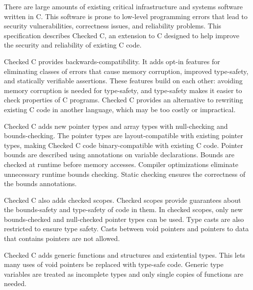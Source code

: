 
\parbox{6.0in}{
There are large amounts of existing critical infrastructure and
systems software written in C. This software is prone to
low-level programming errors that lead to security vulnerabilities,
correctness issues, and reliability problems.  This specification describes
Checked C, an extension to C designed to help improve the security and 
reliability of existing C code.
}

\vspace{11pt}

\parbox{6.0in}{Checked C provides backwards-compatibility.
It adds opt-in features for eliminating classes of errors that
cause memory corruption, improved type-safety, and  statically verifiable
assertions.
These features build on each other: avoiding memory corruption
is needed for type-safety, and type-safety makes it easier
to check properties of C programs.
Checked C provides an alternative to rewriting existing C code in another
language, which may be too costly or impractical.}

\vspace{11pt}

\parbox{6.0in}{Checked C adds new pointer types and array types
with null-checking and bounds-checking.  
The pointer types
are layout-compatible with existing pointer
types, making Checked C code binary-compatible with existing C code.
Pointer bounds are described using annotations on variable declarations.
Bounds are checked at runtime before memory accesses.
Compiler optimizations eliminate unnecessary runtime bounds checking.
Static checking ensures the correctness of the bounds annotations.}

\vspace{11pt}

\parbox{6.0in}{Checked C also adds checked scopes. Checked scopes
provide guarantees about the bounds-safety and type-safety of code
in them. In checked
scopes, only new bounds-checked and null-checked pointer types
can be used.  Type casts are also restricted to ensure type
safety.  Casts between void pointers and pointers to
 data that contains pointers are not allowed.}

\vspace{11pt}

\parbox{6.0in}{Checked C adds generic functions and structures
and existential types. This lets many uses of void pointers be replaced
with type-safe code. Generic type variables are treated as incomplete
types and only single copies of functions are needed.}

\vspace{11pt}
